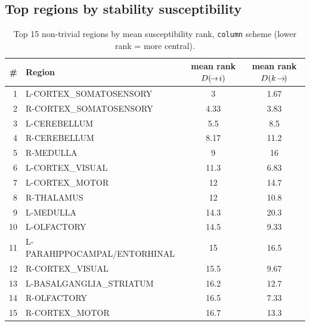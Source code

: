 \subsection{Top regions by stability susceptibility}
\begin{table}[H]\centering\small
\caption{Top 15 non-trivial regions by mean susceptibility rank, \texttt{column} scheme (lower rank = more central).}
\begin{tabular}{@{}rlcc@{}}\toprule
\# & Region & mean rank $D(\!\to\! i)$ & mean rank $D(k\!\to\!)$ \\\midrule
1 & L-CORTEX\_SOMATOSENSORY & 3 & 1.67 \\
2 & R-CORTEX\_SOMATOSENSORY & 4.33 & 3.83 \\
3 & L-CEREBELLUM & 5.5 & 8.5 \\
4 & R-CEREBELLUM & 8.17 & 11.2 \\
5 & R-MEDULLA & 9 & 16 \\
6 & L-CORTEX\_VISUAL & 11.3 & 6.83 \\
7 & L-CORTEX\_MOTOR & 12 & 14.7 \\
8 & R-THALAMUS & 12 & 10.8 \\
9 & L-MEDULLA & 14.3 & 20.3 \\
10 & L-OLFACTORY & 14.5 & 9.33 \\
11 & L-PARAHIPPOCAMPAL/ENTORHINAL & 15 & 16.5 \\
12 & R-CORTEX\_VISUAL & 15.5 & 9.67 \\
13 & L-BASALGANGLIA\_STRIATUM & 16.2 & 12.7 \\
14 & R-OLFACTORY & 16.5 & 7.33 \\
15 & R-CORTEX\_MOTOR & 16.7 & 13.3 \\
\bottomrule\end{tabular}\end{table}
